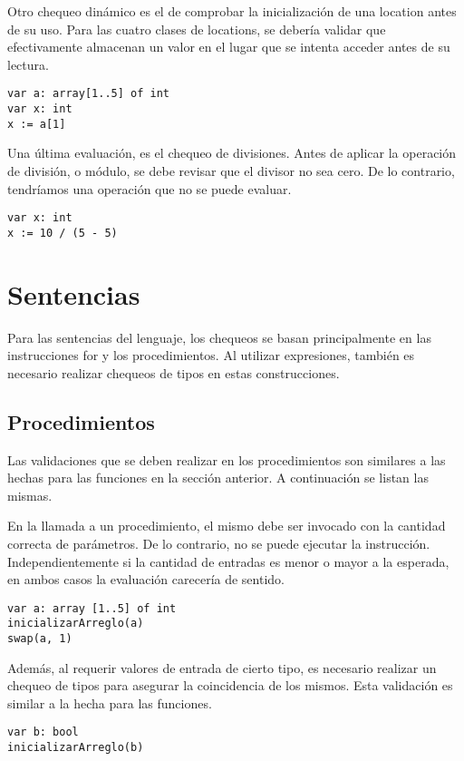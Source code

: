 \documentclass{article}
\begin{document}
Otro chequeo dinámico es el de comprobar la inicialización de una location antes de su uso.
Para las cuatro clases de locations, se debería validar que efectivamente almacenan un valor en el lugar que se intenta acceder antes de su lectura.
\begin{lstlisting}
var a: array[1..5] of int
var x: int
x := a[1]
\end{lstlisting}

Una última evaluación, es el chequeo de divisiones.
Antes de aplicar la operación de división, o módulo, se debe revisar que el divisor no sea cero.
De lo contrario, tendríamos una operación que no se puede evaluar.
\begin{lstlisting}
var x: int
x := 10 / (5 - 5)
\end{lstlisting}

\section{Sentencias}

Para las sentencias del lenguaje, los chequeos se basan principalmente en las instrucciones for y los procedimientos.
Al utilizar expresiones, también es necesario realizar chequeos de tipos en estas construcciones.

\subsection{Procedimientos}

Las validaciones que se deben realizar en los procedimientos son similares a las hechas para las funciones en la sección anterior.
A continuación se listan las mismas.

En la llamada a un procedimiento, el mismo debe ser invocado con la cantidad correcta de parámetros.
De lo contrario, no se puede ejecutar la instrucción.
Independientemente si la cantidad de entradas es menor o mayor a la esperada, en ambos casos la evaluación carecería de sentido.
\begin{lstlisting}
var a: array [1..5] of int
inicializarArreglo(a)
swap(a, 1)
\end{lstlisting}

Además, al requerir valores de entrada de cierto tipo, es necesario realizar un chequeo de tipos para asegurar la coincidencia de los mismos.
Esta validación es similar a la hecha para las funciones.
\begin{lstlisting}
var b: bool
inicializarArreglo(b)
\end{lstlisting}
\end{document}
